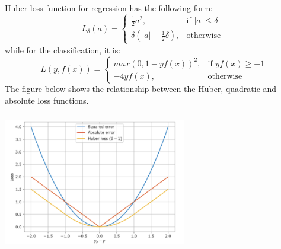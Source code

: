 \documentclass[12pt, letterpaper, twoside]{article}
\begin{document}
Huber loss function for regression has the following form:
\[
    L_{\delta}(a)=
\begin{cases}
    \frac{1}{2}a^2,& \text{if } |a|\le\delta\\
    \delta(|a|-\frac{1}{2}\delta),& \text{otherwise }
\end{cases}
\]
while for the classification, it is:
\[
    L(y,f(x))=
\begin{cases}
   max(0,1-yf(x))^2,& \text{if } yf(x)\ge-1 \\
    -4yf(x),& \text{otherwise }
\end{cases}
\]
The figure below shows the relationship between the Huber, quadratic and absolute loss functions.
\begin{center}
\includegraphics[width=8cm, height=6cm]{relation}
\end{center}
\end{document}
